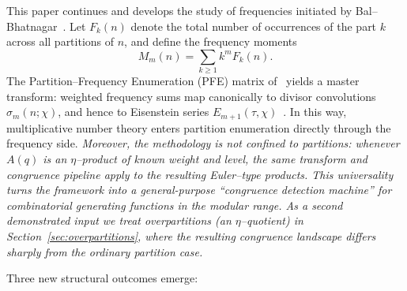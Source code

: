 \documentclass[11pt]{article}
\theoremstyle{definition}
\theoremstyle{remark}
\begin{document}
This paper continues and develops the study of frequencies initiated
by Bal--Bhatnagar~\cite{BB21}. Let $F_k(n)$ denote the total number of
occurrences of the part $k$ across all partitions of $n$, and define the
frequency moments
\[
M_m(n)=\sum_{k\ge1} k^m F_k(n).
\]
The Partition--Frequency Enumeration (PFE) matrix of~\cite{BB21} yields
a master transform: weighted frequency sums map canonically to divisor
convolutions $\sigma_m(n;\chi)$, and hence to Eisenstein series
$E_{m+1}(\tau,\chi)$~\cite{Apostol76,Miyake2006}. In this way,
multiplicative number theory enters partition enumeration directly
through the frequency side.  
\emph{Moreover, the methodology is not confined to partitions: whenever
$A(q)$ is an $\eta$--product of known weight and level, the same transform
and congruence pipeline apply to the resulting Euler--type products.
This universality turns the framework into a general-purpose ``congruence
detection machine'' for combinatorial generating functions in the modular range.
As a second demonstrated input we treat overpartitions (an $\eta$--quotient) in
Section~\ref{sec:overpartitions}, where the resulting congruence landscape
differs sharply from the ordinary partition case.}


Three new structural outcomes emerge:
\end{document}
